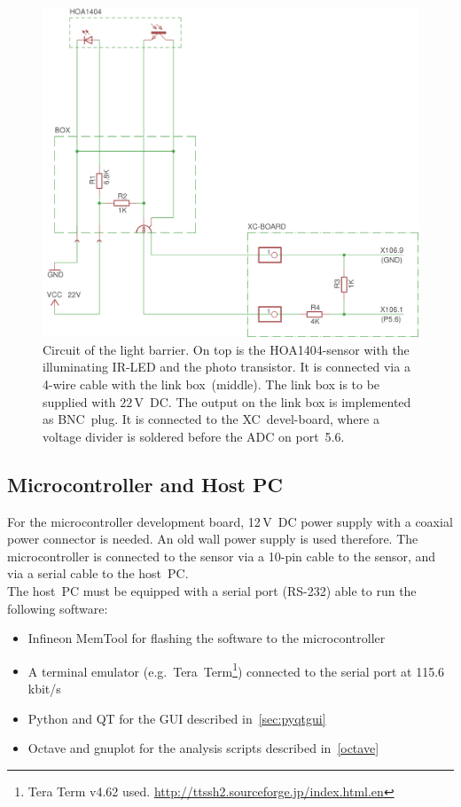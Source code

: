 \documentclass[12pt,a4paper]{article}
\begin{document}
\begin{figure}[htbp]
\begin{center}
\includegraphics[width=\textwidth]{figures/light_barrier_sch.png}
\caption{\label{fig:lb_mb}
Circuit of the light barrier.
On top is the HOA1404-sensor with the illuminating IR-LED and the photo transistor. 
It is connected via a 4-wire cable with the link box~(middle).
The link box is to be supplied with $22\,$V~DC.
The output on the link box is implemented as BNC~plug.
It is connected to the XC~devel-board, where a voltage divider is soldered before the ADC on port~5.6.
}
\end{center}
\end{figure}


\subsection{Microcontroller and Host PC}      

For the microcontroller development board, 12\,V~DC power supply with a coaxial power connector is needed.
An old wall power supply is used therefore.
The microcontroller is connected to the sensor via a 10-pin cable to the sensor, and via a serial cable to the host~PC.\\
The host~PC must be equipped with a serial port (RS-232) able to run the following software:
\begin{itemize}
 \item Infineon MemTool for flashing the software to the microcontroller
 \item A terminal emulator (e.g.\ Tera~Term\footnote{Tera Term v4.62 used. \url{http://ttssh2.sourceforge.jp/index.html.en}}) connected to the serial port at 115.6\,kbit/s
 \item Python and QT for the GUI described in~\autoref{sec:pyqtgui}
 \item Octave and gnuplot for the analysis scripts described in~\autoref{octave}
\end{itemize}
\end{document}
